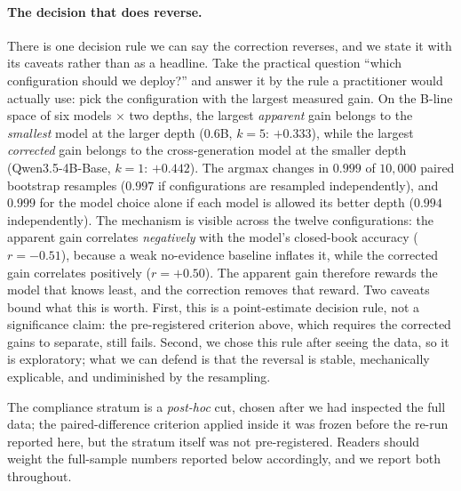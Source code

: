 \documentclass[11pt]{article}
\begin{document}
\paragraph{The decision that does reverse.} There is one decision rule we can say the
correction reverses, and we state it with its caveats rather than as a headline.
Take the practical question ``which configuration should we deploy?'' and answer it by the
rule a practitioner would actually use: pick the configuration with the largest measured gain.
On the B-line space of six models $\times$ two depths, the largest \emph{apparent} gain
belongs to the \emph{smallest} model at the larger depth ($0.6$B, $k{=}5$: $+0.333$),
while the largest \emph{corrected} gain belongs to the cross-generation model at the smaller
depth (Qwen3.5-4B-Base, $k{=}1$: $+0.442$).
The argmax changes in $\mathbf{0.999}$ of $10{,}000$ paired bootstrap resamples ($0.997$ if
configurations are resampled independently), and $0.999$ for the model choice alone if each
model is allowed its better depth ($0.994$ independently). The mechanism is visible across the twelve configurations: the apparent gain
correlates \emph{negatively} with the model's closed-book accuracy ($r{=}-0.51$), because a
weak no-evidence baseline inflates it, while the corrected gain correlates positively
($r{=}+0.50$). The apparent gain therefore rewards the model that knows least, and the
correction removes that reward. Two caveats bound what this is worth. First, this is a
point-estimate decision rule, not a significance claim: the pre-registered criterion above,
which requires the corrected gains to separate, still fails. Second, we chose this rule after
seeing the data, so it is exploratory; what we can defend is that the reversal is stable,
mechanically explicable, and undiminished by the resampling.

The compliance stratum is a \emph{post-hoc} cut, chosen after we had inspected the full
data; the paired-difference criterion applied inside it was frozen before the re-run
reported here, but the stratum itself was not pre-registered. Readers should weight the
full-sample numbers reported below accordingly, and we report both throughout.
\end{document}
